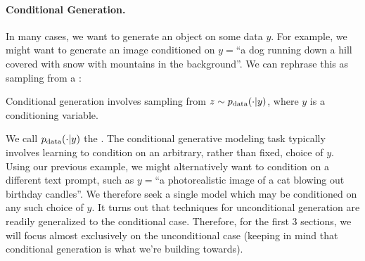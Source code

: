 \paragraph{Conditional Generation.} In many cases, we want to generate an object  on some data $y$. For example, we might want to generate an image conditioned on $y=$``a dog running down a hill covered with snow with mountains in the background''. We can rephrase this as sampling from a :
\begin{ideabox}
    Conditional generation involves sampling from $z\sim p_{\rm{data}}(\cdot | y)$, where $y$ is a conditioning variable.
\end{ideabox}
We call $p_{\rm{data}}(\cdot|y)$ the . The conditional generative modeling task typically involves learning to condition on an arbitrary, rather than fixed, choice of $y$. Using our previous example, we might alternatively want to condition on a different text prompt, such as $y=$``a photorealistic image of a cat blowing out birthday candles''. We therefore seek a single model which may be conditioned on any such choice of $y$. It turns out that techniques for unconditional generation are readily generalized to the conditional case. Therefore, for the first 3 sections, we will focus almost exclusively on the unconditional case (keeping in mind that conditional generation is what we're building towards).



